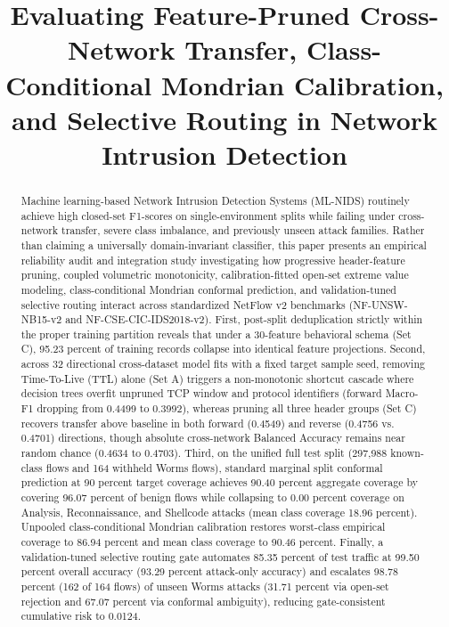 ﻿\documentclass[conference]{IEEEtran}
\begin{document}
\title{Evaluating Feature-Pruned Cross-Network Transfer, Class-Conditional Mondrian Calibration, and Selective Routing in Network Intrusion Detection}

\author{
}

\maketitle

\begin{abstract}
Machine learning-based Network Intrusion Detection Systems (ML-NIDS) routinely achieve high closed-set F1-scores on single-environment splits while failing under cross-network transfer, severe class imbalance, and previously unseen attack families. Rather than claiming a universally domain-invariant classifier, this paper presents an empirical reliability audit and integration study investigating how progressive header-feature pruning, coupled volumetric monotonicity, calibration-fitted open-set extreme value modeling, class-conditional Mondrian conformal prediction, and validation-tuned selective routing interact across standardized NetFlow v2 benchmarks (NF-UNSW-NB15-v2 and NF-CSE-CIC-IDS2018-v2). First, post-split deduplication strictly within the proper training partition reveals that under a 30-feature behavioral schema (Set C), 95.23 percent of training records collapse into identical feature projections. Second, across 32 directional cross-dataset model fits with a fixed target sample seed, removing Time-To-Live (TTL) alone (Set A) triggers a non-monotonic shortcut cascade where decision trees overfit unpruned TCP window and protocol identifiers (forward Macro-F1 dropping from 0.4499 to 0.3992), whereas pruning all three header groups (Set C) recovers transfer above baseline in both forward (0.4549) and reverse (0.4756 vs. 0.4701) directions, though absolute cross-network Balanced Accuracy remains near random chance (0.4634 to 0.4703). Third, on the unified full test split (297,988 known-class flows and 164 withheld Worms flows), standard marginal split conformal prediction at 90 percent target coverage achieves 90.40 percent aggregate coverage by covering 96.07 percent of benign flows while collapsing to 0.00 percent coverage on Analysis, Reconnaissance, and Shellcode attacks (mean class coverage 18.96 percent). Unpooled class-conditional Mondrian calibration restores worst-class empirical coverage to 86.94 percent and mean class coverage to 90.46 percent. Finally, a validation-tuned selective routing gate automates 85.35 percent of test traffic at 99.50 percent overall accuracy (93.29 percent attack-only accuracy) and escalates 98.78 percent (162 of 164 flows) of unseen Worms attacks (31.71 percent via open-set rejection and 67.07 percent via conformal ambiguity), reducing gate-consistent cumulative risk to 0.0124.
\end{abstract}
\end{document}
